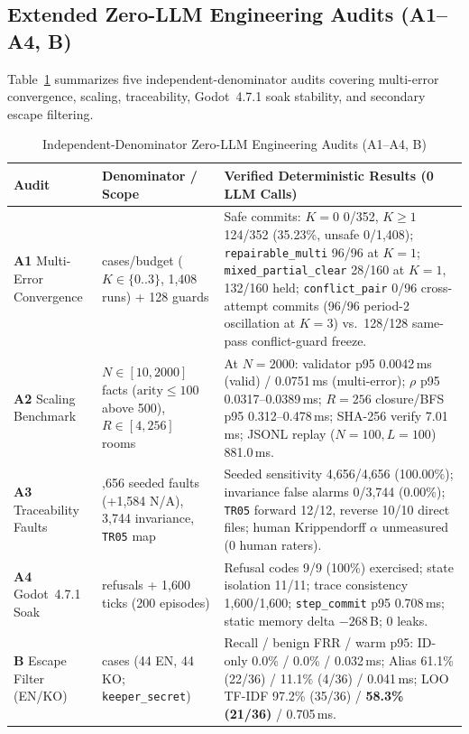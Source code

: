 \subsection{Extended Zero-LLM Engineering Audits (A1--A4, B)}
Table~\ref{tab:extended-compact} summarizes five independent-denominator audits covering multi-error convergence, scaling, traceability, Godot~4.7.1 soak stability, and secondary escape filtering.
\begin{table}[!tbp]
\caption{Independent-Denominator Zero-LLM Engineering Audits (A1--A4, B)}
\label{tab:extended-compact}
\centering
\footnotesize
\begin{tabularx}{\textwidth}{@{}>{\raggedright\arraybackslash}p{}>{\raggedright\arraybackslash}p{}>{\raggedright\arraybackslash}X@{}}
\toprule
\textbf{Audit} & \textbf{Denominator / Scope} & \textbf{Verified Deterministic Results (0 LLM Calls)} \\
\midrule
\textbf{A1} Multi-Error Convergence & 352 cases/budget ($K{\in}\{0..3\}$, 1,408 runs) + 128 guards & Safe commits: $K{=}0$ 0/352, $K{\ge}1$ 124/352 (35.23\%, unsafe 0/1,408); \texttt{repairable\_multi} 96/96 at $K{=}1$; \texttt{mixed\_partial\_clear} 28/160 at $K{=}1$, 132/160 held; \texttt{conflict\_pair} 0/96 cross-attempt commits (96/96 period-2 oscillation at $K{=}3$) vs.\ 128/128 same-pass conflict-guard freeze. \\
\textbf{A2} Scaling Benchmark & $N{\in}[10,2000]$ facts ($\text{arity}{\le}100$ above 500), $R{\in}[4,256]$ rooms & At $N{=}2000$: validator p95 0.0042\,ms (valid) / 0.0751\,ms (multi-error); $\rho$ p95 0.0317--0.0389\,ms; $R{=}256$ closure/BFS p95 0.312--0.478\,ms; SHA-256 verify 7.01\,ms; JSONL replay ($N{=}100,L{=}100$) 881.0\,ms. \\
\textbf{A3} Traceability Faults & 4,656 seeded faults (+1,584 N/A), 3,744 invariance, \texttt{TR05} map & Seeded sensitivity 4,656/4,656 (100.00\%); invariance false alarms 0/3,744 (0.00\%); \texttt{TR05} forward 12/12, reverse 10/10 direct files; human Krippendorff $\alpha$ unmeasured (0 human raters). \\
\textbf{A4} Godot~4.7.1 Soak & 11 refusals + 1,600 ticks (200 episodes) & Refusal codes 9/9 (100\%) exercised; state isolation 11/11; trace consistency 1,600/1,600; \texttt{step\_commit} p95 0.708\,ms; static memory delta $-268$\,B; 0 leaks. \\
\textbf{B} Escape Filter (EN/KO) & 88 cases (44 EN, 44 KO; \texttt{keeper\_secret}) & Recall / benign FRR / warm p95: ID-only 0.0\% / 0.0\% / 0.032\,ms; Alias 61.1\% (22/36) / 11.1\% (4/36) / 0.041\,ms; LOO TF-IDF 97.2\% (35/36) / \textbf{58.3\% (21/36)} / 0.705\,ms. \\
\bottomrule
\end{tabularx}
\end{table}

